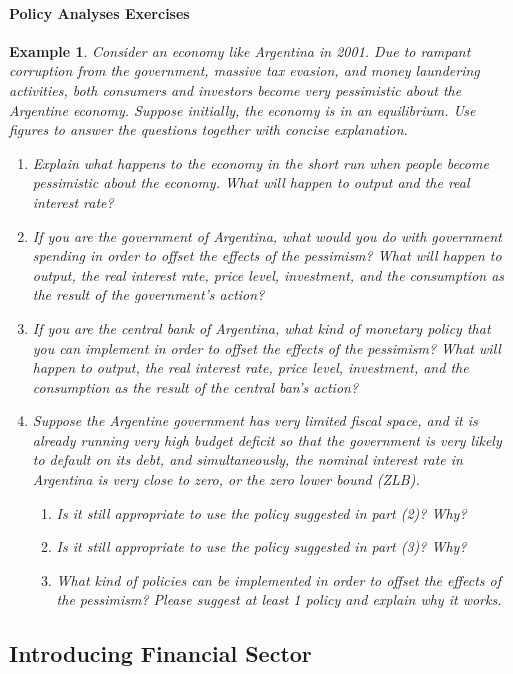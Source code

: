 \documentclass[12pt]{article}
\newtheorem{example}{Example}
\begin{document}
\paragraph{Policy Analyses Exercises}
\begin{example}
    Consider an economy like Argentina in 2001. Due to rampant corruption from the government, massive tax evasion, and money laundering activities, both consumers and investors become very pessimistic about the Argentine economy. Suppose initially, the economy is in an equilibrium. Use figures to answer the questions together with concise explanation.
    \begin{enumerate}[label=(\arabic*)]
        \item Explain what happens to the economy in the short run when people become pessimistic about the economy. What will happen to output and the real interest rate?
        \item If you are the government of Argentina, what would you do with government spending in order to offset the effects of the pessimism? What will happen to output, the real interest rate, price level, investment, and the consumption as the result of the government's action?
        \item If you are the central bank of Argentina, what kind of monetary policy that you can implement in order to offset the effects of the pessimism? What will happen to output, the real interest rate, price level, investment, and the consumption as the result of the central ban's action?
        \item Suppose the Argentine government has very limited fiscal space, and it is already running very high budget deficit so that the government is very likely to default on its debt, and simultaneously, the nominal interest rate in Argentina is very close to zero, or the zero lower bound (ZLB). 
        \begin{enumerate}[label=\alph*.]
            \item Is it still appropriate to use the policy suggested in part (2)? Why?
            \item Is it still appropriate to use the policy suggested in part (3)? Why?
            \item What kind of policies can be implemented in order to offset the effects of the pessimism? Please suggest at least 1 policy and explain why it works.
        \end{enumerate}
    \end{enumerate}
\end{example}

\subsection*{Introducing Financial Sector}
\end{document}
